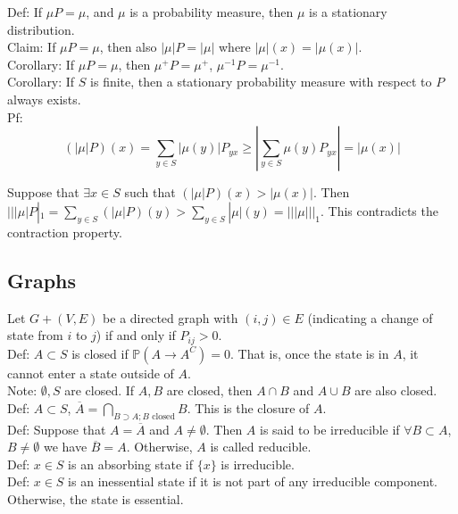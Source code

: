 \documentclass[english, 11pt]{article}
\begin{document}
Def: If $\mu P = \mu$, and $\mu$ is a probability measure, then $\mu$ is a stationary distribution.\\

Claim: If $\mu P = \mu$, then also $|\mu|P = |\mu|$ where $|\mu|(x) = |\mu(x)|$.\\

Corollary: If $\mu P = \mu$, then $\mu^+ P = \mu^+$, $\mu^{-1} P = \mu^{-1}$.\\
Corollary: If $S$ is finite, then a stationary probability measure with respect to $P$ always exists.\\

Pf:
\[(|\mu|P)(x) = \sum_{y \in S} |\mu(y)|P_{yx} \geq |\sum_{y \in S} \mu(y) P_{yx}| = |\mu(x)|\]

Suppose that $\exists x \in S$ such that $(|\mu|P)(x) > |\mu(x)|$. Then $|||\mu|P|_1 = \sum_{y \in S} (|\mu|P)(y) > \sum_{y \in S} |\mu|(y) = |||\mu|||_1$. This contradicts the contraction property.\\

\subsection{Graphs}

Let $G + (V, E)$ be a directed graph with $(i, j) \in E$ (indicating a change of state from $i$ to $j$) if and only if $P_{ij} > 0$.\\

Def: $A \subset S$ is closed if $\mathbb{P}(A \to A^C) = 0$. That is, once the state is in $A$, it cannot enter a state outside of $A$.\\

Note: $\emptyset, S$ are closed. If $A, B$ are closed, then $A \cap B$ and $A \cup B$ are also closed.\\

Def: $A \subset S$, $\overline{A} = \bigcap_{B \supset A; B \text{ closed}} B$. This is the closure of $A$.\\

Def: Suppose that $A = \overline{A}$ and $A \neq \emptyset$. Then $A$ is said to be irreducible if $\forall B \subset A$, $B \neq \emptyset$ we have $\overline{B} = A$. Otherwise, $A$ is called reducible.\\

Def: $x \in S$ is an absorbing state if $\{x\}$ is irreducible.\\

Def: $x \in S$ is an inessential state if it is not part of any irreducible component. Otherwise, the state is essential.\\
\end{document}

